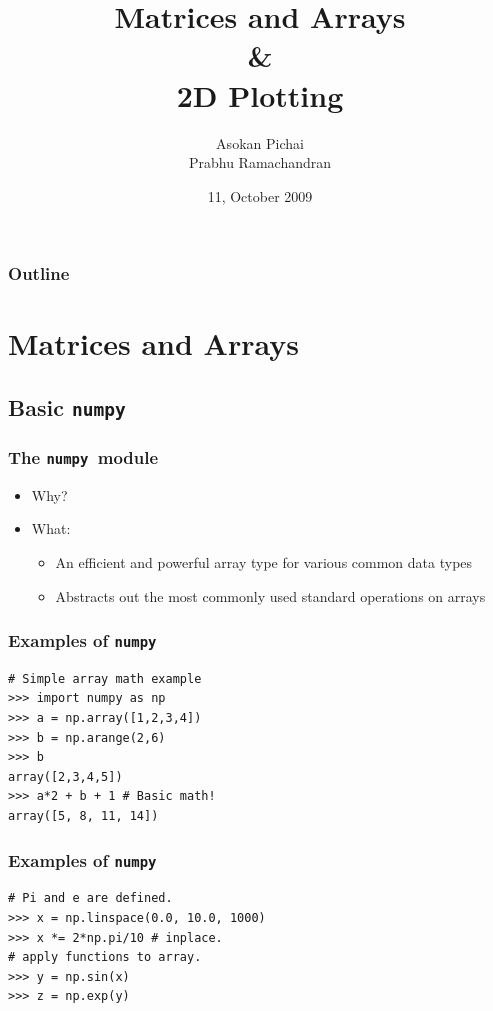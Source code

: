 \documentclass[14pt,compress]{beamer}
\title[]{Matrices and Arrays\\ \& \\2D Plotting}
\author[FOSSEE Team] {Asokan Pichai\\Prabhu Ramachandran}
\institute[IIT Bombay] {Department of Aerospace Engineering\\IIT Bombay}
\date[] {11, October 2009}
\newcounter{time}
\newcommand{\inctime}[1]{\addtocounter{time}{#1}{\tiny \thetime\ m}}
\newcommand{\typ}[1]{\lstinline{#1}}
\begin{document}
\begin{frame}
  \maketitle
\end{frame}

\begin{frame}
  \frametitle{Outline}
  \tableofcontents
\end{frame}

\section{Matrices and Arrays}

\subsection{Basic \typ{numpy} }

\newcommand{\num}{\texttt{numpy}}

\begin{frame}
  \frametitle{The \num\ module}
  \begin{itemize}
      \item Why?
  \item What:
    \begin{itemize}
    \item An efficient and powerful array type for various common data types
    \item Abstracts out the most commonly used standard operations on arrays
    \end{itemize}
  \end{itemize}
\end{frame}

\begin{frame}[fragile]
  \frametitle{Examples of \num}
\begin{lstlisting}
# Simple array math example
>>> import numpy as np
>>> a = np.array([1,2,3,4])
>>> b = np.arange(2,6)
>>> b
array([2,3,4,5])
>>> a*2 + b + 1 # Basic math!
array([5, 8, 11, 14])
\end{lstlisting}
\end{frame}

\begin{frame}[fragile]
  \frametitle{Examples of \num}
\begin{lstlisting}
# Pi and e are defined.
>>> x = np.linspace(0.0, 10.0, 1000)
>>> x *= 2*np.pi/10 # inplace.
# apply functions to array.
>>> y = np.sin(x)
>>> z = np.exp(y)
\end{lstlisting}
\inctime{5}
\end{frame}
\end{document}
